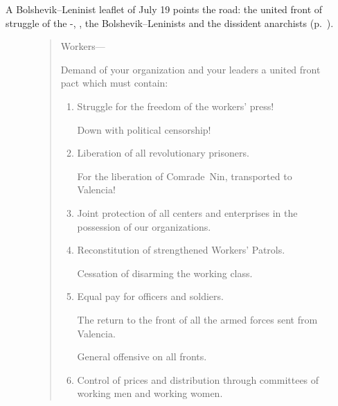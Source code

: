 A Bolshevik--Leninist leaflet of July 19 points the road: the united front of struggle of the \CNT-\FAI, \POUM\kn, the Bolshevik--Leninists and the dissident anarchists (p.~\pageref{fig:bolshlenleaflet2}).

\begin{figure}
\begin{oframed}
  \begin{quote}
  	\normalsize
  	\raggedright
  	
  	\medskip
  	
  	Workers---
  
    \smallskip
  	
  	Demand of your organization and your leaders a united front pact which must contain:
  
    \smallskip
  
    \begin{enumerate}[leftmargin=2em, labelindent=0.5em, itemindent=-1em]
      \item Struggle for the freedom of the workers’ press!
      
      Down with political censorship!
      
      \item Liberation of all revolutionary prisoners.
      
      For the liberation of Comrade~Nin,{\indexANin} transported to Valencia!
      
      \item Joint protection of all centers and enterprises in the possession of our organizations.
      
      \item Reconstitution of strengthened Workers’ Patrols.
      
      Cessation of disarming the working class.
      
      \item Equal pay for officers and soldiers.
      
      The return to the front of all the armed forces sent from Valencia.
      
      General offensive on all fronts.
      
      \item Control of prices and distribution through committees of working men and working women.
      

\end{enumerate}
\end{quote}
\end{oframed}
\end{figure}
